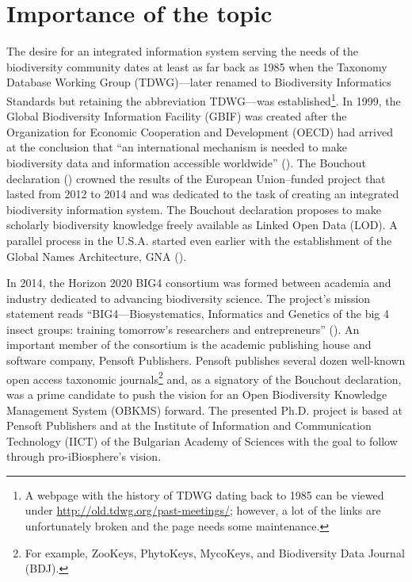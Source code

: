 \label{chapter-introduction} 
\newcommand{\keyword}[1]{\textbf{#1}}
\newcommand{\tabhead}[1]{\textbf{#1}}
\newcommand{\code}[1]{\texttt{#1}}
\newcommand{\file}[1]{\texttt{\bfseries#1}}
\newcommand{\option}[1]{\texttt{\itshape#1}}
\section*{Importance of the topic}
The desire for an integrated information system serving the needs of the biodiversity community dates at least as far back as 1985 when the Taxonomy Database Working Group (TDWG)---later renamed to Biodiversity Informatics Standards but retaining the abbreviation TDWG---was established\footnote{A webpage with the history of TDWG dating back to 1985 can be viewed under \url{http://old.tdwg.org/past-meetings/}; however, a lot of the links are unfortunately broken and the page needs some maintenance.}. In 1999, the Global Biodiversity Information Facility (GBIF) was created after the Organization for Economic Cooperation and Development (OECD) had arrived at the conclusion that ``an international mechanism is needed to make biodiversity data and information accessible worldwide'' (\cite{noauthor_what_nodate}).  The Bouchout declaration (\cite{agosti_bouchout_2014}) crowned the results of the European Union--funded project \cite{noauthor_pro-ibiosphere_nodate} that lasted from 2012 to 2014 and was dedicated to the task of creating an integrated biodiversity information system. The Bouchout declaration proposes to make scholarly biodiversity knowledge freely available as Linked Open Data (LOD).  A parallel process in the U.S.A. started even earlier with the establishment of the Global Names Architecture, GNA (\cite{patterson_names_2010,pyle_towards_2016}).

In 2014, the Horizon 2020 BIG4 consortium was formed between academia and industry dedicated to advancing biodiversity science.  The project's mission statement reads ``BIG4---Biosystematics, Informatics and Genetics of the big 4 insect groups: training tomorrow's researchers and entrepreneurs'' (\cite{university_of_copenhagen_big4_2014}). An important member of the consortium is the academic publishing house and software company, Pensoft Publishers. Pensoft publishes several dozen well-known open access taxonomic journals\footnote{For example, ZooKeys, PhytoKeys, MycoKeys, and Biodiversity Data Journal (BDJ).} and, as a signatory of the Bouchout declaration, was a prime candidate to push the vision for an Open Biodiversity Knowledge Management System (OBKMS) forward. The presented Ph.D. project is based at Pensoft Publishers and at the Institute of Information and Communication Technology (IICT) of the Bulgarian Academy of Sciences with the goal to follow through pro-iBiosphere's vision.


